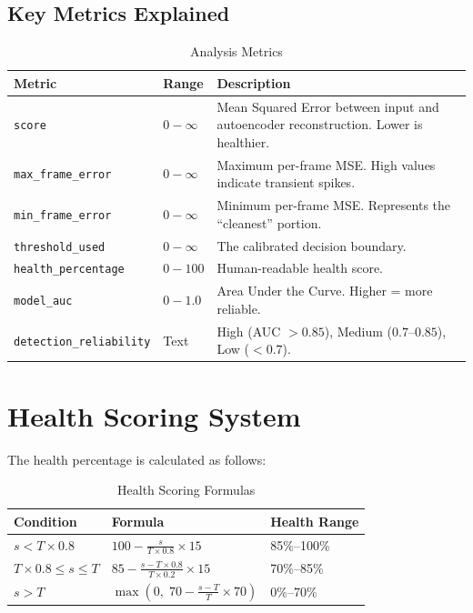 \documentclass[10pt, a4paper, oneside]{report}
\begin{document}
\subsection{Key Metrics Explained}

\begin{table}[H]
\centering
\caption{Analysis Metrics}
\label{tab:metrics}
\begin{tabularx}{\textwidth}{l l X}
  \toprule
  \textbf{Metric} & \textbf{Range} & \textbf{Description} \\
  \midrule
  \texttt{score}                & $0 - \infty$  & Mean Squared Error between input and autoencoder reconstruction. Lower is healthier. \\
  \texttt{max\_frame\_error}    & $0 - \infty$  & Maximum per-frame MSE. High values indicate transient spikes. \\
  \texttt{min\_frame\_error}    & $0 - \infty$  & Minimum per-frame MSE. Represents the ``cleanest'' portion. \\
  \texttt{threshold\_used}      & $0 - \infty$  & The calibrated decision boundary. \\
  \texttt{health\_percentage}   & $0 - 100$     & Human-readable health score. \\
  \texttt{model\_auc}           & $0 - 1.0$     & Area Under the Curve. Higher = more reliable. \\
  \texttt{detection\_reliability} & Text         & High (AUC $> 0.85$), Medium ($0.7$--$0.85$), Low ($< 0.7$). \\
  \bottomrule
\end{tabularx}
\end{table}

\section{Health Scoring System}
\label{sec:health-scoring}

The health percentage is calculated as follows:

\begin{table}[H]
\centering
\caption{Health Scoring Formulas}
\label{tab:health-formulas}
\begin{tabularx}{\textwidth}{l X l}
  \toprule
  \textbf{Condition} & \textbf{Formula} & \textbf{Health Range} \\
  \midrule
  $s < T \times 0.8$              & $100 - \frac{s}{T \times 0.8} \times 15$                          & 85\%--100\% \\[6pt]
  $T \times 0.8 \leq s \leq T$   & $85 - \frac{s - T \times 0.8}{T \times 0.2} \times 15$            & 70\%--85\%  \\[6pt]
  $s > T$                         & $\max\!\left(0,\; 70 - \frac{s - T}{T} \times 70\right)$          & 0\%--70\%   \\
  \bottomrule
\end{tabularx}
\end{table}
\end{document}
